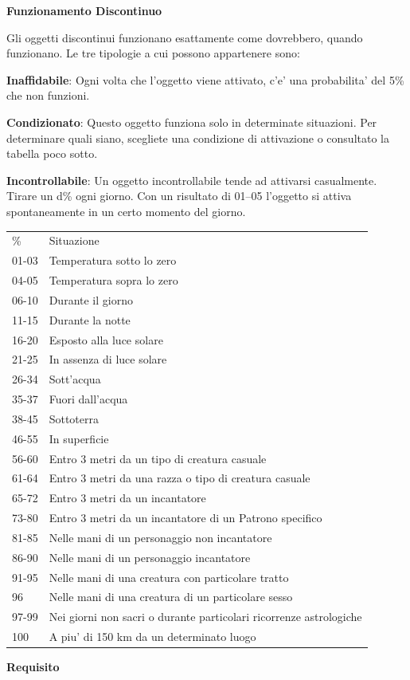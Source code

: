 \documentclass[a4paper,11pt,twoside,openany]{dndbook}
\begin{document}
{\textbf{Funzionamento Discontinuo}

Gli oggetti discontinui funzionano esattamente come dovrebbero, quando funzionano. Le tre tipologie a cui possono appartenere sono:

\textbf{Inaffidabile}: Ogni volta che l'oggetto viene attivato, c'e' una probabilita' del 5\% che non funzioni.

\textbf{Condizionato}: Questo oggetto funziona solo in determinate situazioni. Per determinare quali siano, scegliete una condizione di attivazione o consultato la tabella poco sotto.

\textbf{Incontrollabile}: Un oggetto incontrollabile tende ad attivarsi casualmente. Tirare un d\% ogni giorno. Con un risultato di 01--05 l'oggetto si attiva spontaneamente in un certo momento del giorno.

\begin{tabular}[c]{@{}ll@{}}
\toprule 
\% & Situazione\tabularnewline
01-03 & Temperatura sotto lo zero\tabularnewline
04-05 & Temperatura sopra lo zero\tabularnewline
06-10 & Durante il giorno\tabularnewline
11-15 & Durante la notte\tabularnewline
16-20 & Esposto alla luce solare\tabularnewline
21-25 & In assenza di luce solare\tabularnewline
26-34 & Sott'acqua\tabularnewline
35-37 & Fuori dall'acqua\tabularnewline
38-45 & Sottoterra\tabularnewline
46-55 & In superficie\tabularnewline
56-60 & Entro 3 metri da un tipo di creatura casuale\tabularnewline
61-64 & Entro 3 metri da una razza o tipo di creatura casuale\tabularnewline
65-72 & Entro 3 metri da un incantatore\tabularnewline
73-80 & Entro 3 metri da un incantatore di un Patrono specifico\tabularnewline
81-85 & Nelle mani di un personaggio non incantatore\tabularnewline
86-90 & Nelle mani di un personaggio incantatore\tabularnewline
91-95 & Nelle mani di una creatura con particolare tratto\tabularnewline
96 & Nelle mani di una creatura di un particolare sesso\tabularnewline
97-99 & Nei giorni non sacri o durante particolari ricorrenze astrologiche\tabularnewline
100 & A piu' di 150 km da un determinato luogo\tabularnewline
\bottomrule
\end{tabular}

\textbf{Requisito}

}
\end{document}
